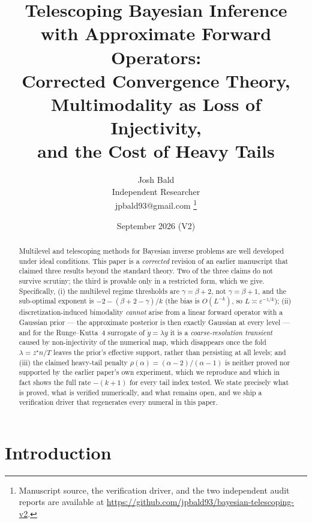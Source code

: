 \documentclass[11pt]{article}
\title{Telescoping Bayesian Inference with Approximate Forward Operators:\\
Corrected Convergence Theory, Multimodality as Loss of Injectivity,\\ and the Cost of Heavy Tails}
\author{Josh Bald\\ \small Independent Researcher\\ \small jpbald93@gmail.com%
\thanks{Manuscript source, the verification driver, and the two independent audit reports are
available at \url{https://github.com/jpbald93/bayesian-telescoping-v2}.}}
\date{September 2026 \quad (V2)}
\theoremstyle{definition}
\theoremstyle{remark}
\begin{document}
\maketitle

\begin{abstract}
Multilevel and telescoping methods for Bayesian inverse problems are well developed under ideal
conditions. This paper is a \emph{corrected} revision of an earlier manuscript that claimed three
results beyond the standard theory. Two of the three claims do not survive scrutiny; the third is
provable only in a restricted form, which we give. Specifically, (i) the multilevel regime
thresholds are $\gamma=\beta+2$, not $\gamma=\beta+1$, and the sub-optimal exponent is
$-2-(\beta+2-\gamma)/k$ (the bias is $O(L^{-k})$, so $L\asymp\varepsilon^{-1/k}$); (ii) discretization-induced bimodality \emph{cannot} arise from a
linear forward operator with a Gaussian prior --- the approximate posterior is then exactly Gaussian
at every level --- and for the Runge--Kutta~4 surrogate of $\dot y=\lambda y$ it is a
\emph{coarse-resolution transient} caused by non-injectivity of the numerical map, which disappears
once the fold $\lambda=z^\star n/T$ leaves the prior's effective support, rather than persisting at
all levels; and
(iii) the claimed heavy-tail penalty $\rho(\alpha)=(\alpha-2)/(\alpha-1)$ is neither proved nor
supported by the earlier paper's own experiment, which we reproduce and which in fact shows the full
rate $-(k+1)$ for every tail index tested. We state precisely what is proved, what is verified
numerically, and what remains open, and we ship a verification driver that regenerates every numeral
in this paper.
\end{abstract}

\section{Introduction}
\end{document}
